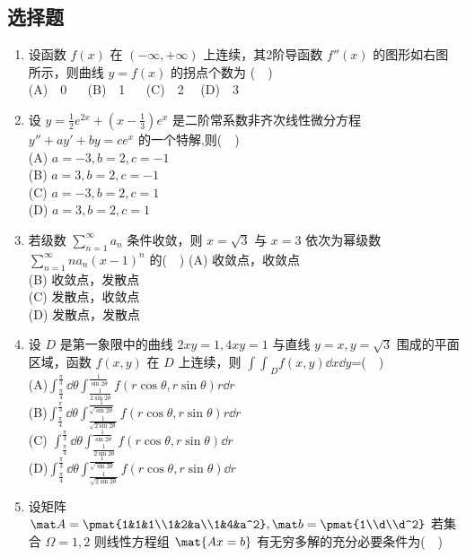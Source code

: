 \subsection{选择题}
\begin{enumerate}($\quad$)
\item 设函数 $f(x)$ 在 $(-\infty,+\infty)$ 上连续，其2阶导函数 $f''(x)$  的图形如右图所示，则曲线 $y=f(x)$ 的拐点个数为 ($\quad$)\\
(A)$\quad$0  $\quad$  (B)$\quad$1 $\quad$  (C)$\quad$2  $\quad$(D)$\quad$3 
\item 设 $y=\frac{1}{2}e^{2x}+(x-\frac{1}{3})e^x$ 是二阶常系数非齐次线性微分方程 $y''+ay'+by=ce^x$  的一个特解,则($\quad$)\\
(A) $a=-3,b=2,c=-1$\\
(B) $a=3,b=2,c=-1$\\
(C) $a=-3,b=2,c=1$\\
(D) $a=3,b=2,c=1$
\item 若级数 $\displaystyle \sum_{n=1}^\infty a_n $ 条件收敛，则 $x=\sqrt{3}$ 与 $x=3$  依次为幂级数 $\displaystyle \sum_{n=1}^\infty na_n(x-1)^n$  的($\quad$)
(A) 收敛点，收敛点\\
(B) 收敛点，发散点\\
(C) 发散点，收敛点\\
(D) 发散点，发散点
\item  设 $D$ 是第一象限中的曲线 $2xy=1,4xy=1$   与直线 $y=x,y=\sqrt{3}$  围成的平面区域，函数 $f(x,y)$   在 $D$ 上连续，则 $\displaystyle {\int \int}_D f(x,y)\dd{x}\dd{y}$=($\quad$)\\
(A)$\displaystyle  \int_\frac{\pi}{4}^\frac{\pi}{3}\dd{\theta}\int_\frac{1}{2\sin 2\theta}^\frac{1}{\sin 2\theta}f(r\cos \theta,r\sin \theta)r\dd{r}$\\
(B)$\displaystyle  \int_\frac{\pi}{4}^\frac{\pi}{3}\dd{\theta}\int_\frac{1}{\sqrt{2\sin 2\theta}}^\frac{1}{\sqrt{\sin 2\theta}}f(r\cos \theta,r\sin \theta)r\dd{r}$\\
(C) $\displaystyle  \int_\frac{\pi}{4}^\frac{\pi}{3}\dd{\theta}\int_\frac{1}{2\sin 2\theta}^\frac{1}{\sin 2\theta}f(r\cos \theta,r\sin \theta)\dd{r}$\\
(D)$\displaystyle  \int_\frac{\pi}{4}^\frac{\pi}{3}\dd{\theta}\int_\frac{1}{\sqrt{2\sin 2\theta}}^\frac{1}{\sqrt{\sin 2\theta}}f(r\cos \theta,r\sin \theta)\dd{r}$
\item 设矩阵 $\mat A=\pmat{1&1&1\\1&2&a\\1&4&a^2},\mat b=\pmat{1\\d\\d^2}$  若集合 $\Omega={1,2}$ 则线性方程组 $\mat{ Ax=b}$  有无穷多解的充分必要条件为($\quad$)\\

\end{enumerate}
